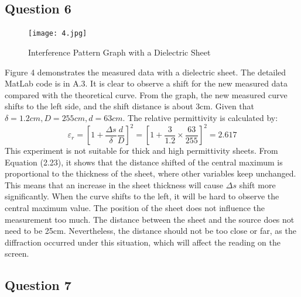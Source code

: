 \documentclass[12pt]{article}
\begin{document}
    
    \subsection{Question 6}
    \paragraph{}
    \begin{figure}[H]
    \centering
    \texttt{[image: 4.jpg]}
    \caption{Interference Pattern Graph with a Dielectric Sheet}
    \end{figure}
    Figure 4 demonstrates the measured data with a dielectric sheet. The detailed MatLab code is in A.3. It is clear to observe a shift for the new measured data compared with the theoretical curve. From the graph, the new measured curve shifts to the left side, and the shift distance is about 3cm. Given that $\delta = 1.2cm, D=255cm, d=63cm$. The relative permittivity is calculated by:
    \begin{equation}
    \varepsilon _r = \left[ 1 + \frac{\Delta s}{\delta} \frac{d}{D} \right] ^ 2 = \left[ 1 + \frac{3}{1.2} \times \frac{63}{255} \right] ^ 2 = 2.617
    \end{equation}
    This experiment is not suitable for thick and high permittivity sheets. From Equation (2.23), it shows that the distance shifted of the central maximum is proportional to the thickness of the sheet, where other variables keep unchanged. This means that an increase in the sheet thickness will cause $\Delta s$ shift more significantly. When the curve shifts to the left, it will be hard to observe the central maximum value. The position of the sheet does not influence the measurement too much. The distance between the sheet and the source does not need to be 25cm. Nevertheless, the distance should not be too close or far, as the diffraction occurred under this situation, which will affect the reading on the screen.
    

    \subsection{Question 7}
\end{document}
